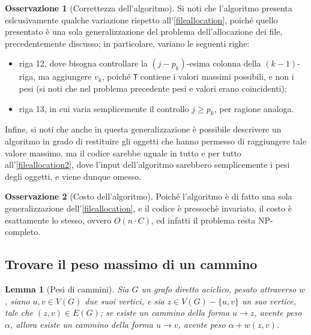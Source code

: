 \documentclass[14pt]{extreport}
\newtheorem{lemma}{Lemma}[subsection]
\theoremstyle{definition}
\theoremstyle{definition}
\newtheorem{remark}{Osservazione}[subsection]
\begin{document}
\begin{remark}[Correttezza dell'algoritmo]
    Si noti che l'algoritmo presenta eslcusivamente qualche variazione rispetto all'\cref{fileallocation}, poiché quello presentato è una sola generalizzazione del problema dell'allocazione dei file, precedentemente discusso; in particolare, variano le seguenti righe:

    \begin{itemize}
        \item riga 12, dove bisogna controllare la $(j - p_k)$-esima colonna della $(k -1)$-riga, ma aggiungere $v_k$, poiché \texttt{T} contiene i valori massimi possibili, e non i pesi (si noti che nel problema precedente pesi e valori erano coincidenti);
        \item riga 13, in cui varia semplicemente il controllo $j \ge p_k$, per ragione analoga.
    \end{itemize}

    Infine, si noti che anche in questa generalizzazione è possibile descrivere un algoritmo in grado di restituire gli oggetti che hanno permesso di raggiungere tale valore massimo, ma il codice sarebbe uguale in tutto e per tutto all'\cref{fileallocation2}, dove l'input dell'algoritmo sarebbero semplicemente i pesi degli oggetti, e viene dunque omesso.
\end{remark}

\begin{remark}[Costo dell'algoritmo]
    Poiché l'algoritmo è di fatto una sola generalizzazione dell'\cref{fileallocation}, e il codice è pressochè invariato, il costo è esattamente lo stesso, ovvero $O(n \cdot C)$, ed infatti il problema resta NP-completo.
\end{remark}

\subsection{Trovare il peso massimo di un cammino}

\begin{lemma}[Pesi di cammini]
    \label{lemma grafi max}
    Sia $G$ un grafo diretto aciclico, pesato attraverso $w$, siano $u, v \in V(G)$ due suoi vertici, e sia $z \in V(G) - \{u, v\}$ un suo vertice, tale che $(z, v) \in E(G)$; se esiste un cammino della forma $u \rightarrow z$, avente peso $\alpha$, allora esiste un cammino della forma $u \rightarrow v$, avente peso $\alpha + w(z, v)$.
\end{lemma}
\end{document}
